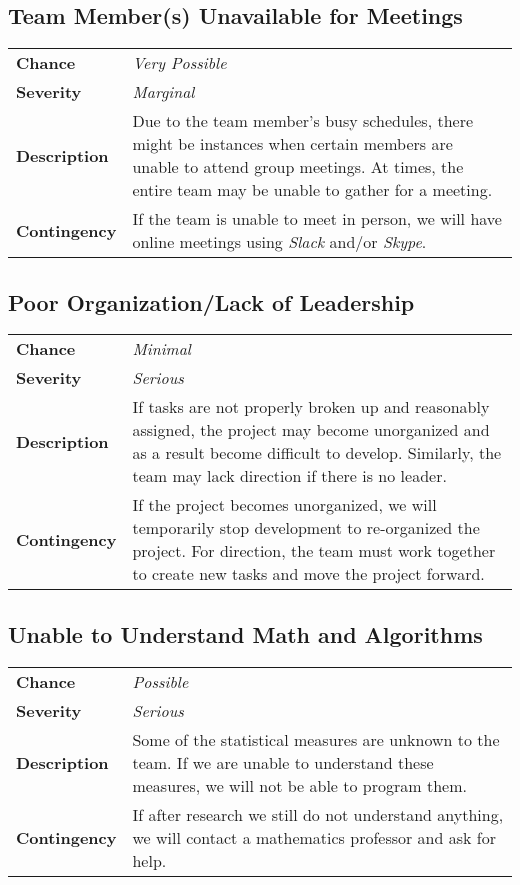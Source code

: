 \documentclass[12pt]{article}
\begin{document}
\subsection*{Team Member(s) Unavailable for Meetings}
\begin{tabular}{ l p{10cm} }
	\textbf{Chance} & \textit{Very Possible} \\
	\textbf{Severity} & \textit{Marginal} \\
	\textbf{Description} & Due to the team member's busy schedules, there might
		be instances when certain members are unable to attend group meetings.
		At times, the entire team may be unable to gather for a meeting. \\
		\textbf{Contingency} & If the team is unable to meet in person, we will
		have online meetings using \textit{Slack} and/or \textit{Skype}.\\
\end{tabular}

\subsection*{Poor Organization/Lack of Leadership}
\begin{tabular}{ l p{10cm} }
	\textbf{Chance} & \textit{Minimal} \\
	\textbf{Severity} & \textit{Serious} \\
	\textbf{Description} & If tasks are not properly broken up and reasonably
		assigned, the project may become unorganized and as a result become
		difficult to develop. Similarly, the team may lack direction if there
		is no leader. \\
	\textbf{Contingency} & If the project becomes unorganized, we will
		temporarily stop development to re-organized the project. For
		direction, the team must work together to create new tasks and move the
		project forward. \\
\end{tabular}

\subsection*{Unable to Understand Math and Algorithms}
\begin{tabular}{ l p{10cm} }
	\textbf{Chance} & \textit{Possible} \\
	\textbf{Severity} & \textit{Serious} \\
	\textbf{Description} & Some of the statistical measures are unknown to the
		team. If we are unable to understand these measures, we will not be
		able to program them. \\
	\textbf{Contingency} & If after research we still do not understand
		anything, we will contact a mathematics professor and ask for help. \\
\end{tabular}
\end{document}
